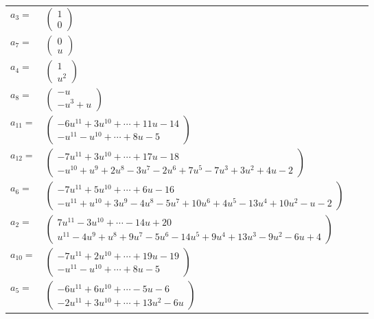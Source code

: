\documentclass[1p]{elsarticle_modified}
\theoremstyle{definition}
\begin{document}
\begin{tabular}{m{7pt} m{180pt} m{7pt} m{180pt} }
\flushright $a_{3}=$&$\begin{pmatrix}1\\0\end{pmatrix}$ \\
\flushright $a_{7}=$&$\begin{pmatrix}0\\u\end{pmatrix}$ \\
\flushright $a_{4}=$&$\begin{pmatrix}1\\u^2\end{pmatrix}$ \\
\flushright $a_{8}=$&$\begin{pmatrix}- u\\- u^3+u\end{pmatrix}$ \\
\flushright $a_{11}=$&$\begin{pmatrix}-6 u^{11}+3 u^{10}+\cdots+11 u-14\\- u^{11}- u^{10}+\cdots+8 u-5\end{pmatrix}$ \\
\flushright $a_{12}=$&$\begin{pmatrix}-7 u^{11}+3 u^{10}+\cdots+17 u-18\\- u^{10}+u^9+2 u^8-3 u^7-2 u^6+7 u^5-7 u^3+3 u^2+4 u-2\end{pmatrix}$ \\
\flushright $a_{6}=$&$\begin{pmatrix}-7 u^{11}+5 u^{10}+\cdots+6 u-16\\- u^{11}+u^{10}+3 u^9-4 u^8-5 u^7+10 u^6+4 u^5-13 u^4+10 u^2- u-2\end{pmatrix}$ \\
\flushright $a_{2}=$&$\begin{pmatrix}7 u^{11}-3 u^{10}+\cdots-14 u+20\\u^{11}-4 u^9+u^8+9 u^7-5 u^6-14 u^5+9 u^4+13 u^3-9 u^2-6 u+4\end{pmatrix}$ \\
\flushright $a_{10}=$&$\begin{pmatrix}-7 u^{11}+2 u^{10}+\cdots+19 u-19\\- u^{11}- u^{10}+\cdots+8 u-5\end{pmatrix}$ \\
\flushright $a_{5}=$&$\begin{pmatrix}-6 u^{11}+6 u^{10}+\cdots-5 u-6\\-2 u^{11}+3 u^{10}+\cdots+13 u^2-6 u\end{pmatrix}$ \\

\end{tabular}
\end{document}
